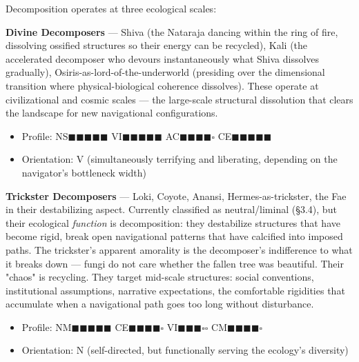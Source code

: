 Decomposition operates at three ecological scales:


\textbf{Divine Decomposers} — Shiva (the Nataraja dancing within the ring of fire, dissolving ossified structures so their energy can be recycled), Kali (the accelerated decomposer who devours instantaneously what Shiva dissolves gradually), Osiris-as-lord-of-the-underworld (presiding over the dimensional transition where physical-biological coherence dissolves). These operate at civilizational and cosmic scales — the large-scale structural dissolution that clears the landscape for new navigational configurations.

\begin{itemize}[nosep,leftmargin=*]
  \item Profile: NS$\blacksquare$$\blacksquare$$\blacksquare$$\blacksquare$$\blacksquare$ VI$\blacksquare$$\blacksquare$$\blacksquare$$\blacksquare$$\blacksquare$ AC$\blacksquare$$\blacksquare$$\blacksquare$$\blacksquare$$\square$ CE$\blacksquare$$\blacksquare$$\blacksquare$$\blacksquare$$\blacksquare$
  \item Orientation: V (simultaneously terrifying and liberating, depending on the navigator's bottleneck width)
\end{itemize}


\textbf{Trickster Decomposers} — Loki, Coyote, Anansi, Hermes-as-trickster, the Fae in their destabilizing aspect. Currently classified as neutral/\allowbreak liminal (§3.4), but their ecological \textit{function} is decomposition: they destabilize structures that have become rigid, break open navigational patterns that have calcified into imposed paths. The trickster's apparent amorality is the decomposer's indifference to what it breaks down — fungi do not care whether the fallen tree was beautiful. Their "chaos" is recycling. They target mid-scale structures: social conventions, institutional assumptions, narrative expectations, the comfortable rigidities that accumulate when a navigational path goes too long without disturbance.

\begin{itemize}[nosep,leftmargin=*]
  \item Profile: NM$\blacksquare$$\blacksquare$$\blacksquare$$\blacksquare$$\blacksquare$ CE$\blacksquare$$\blacksquare$$\blacksquare$$\blacksquare$$\square$ VI$\blacksquare$$\blacksquare$$\blacksquare$$\square$$\square$ CM$\blacksquare$$\blacksquare$$\blacksquare$$\blacksquare$$\square$
  \item Orientation: N (self-directed, but functionally serving the ecology's diversity)
\end{itemize}


